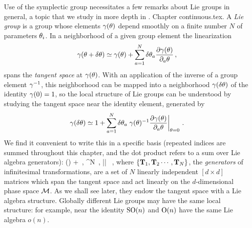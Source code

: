 %
Use of the symplectic group necessitates a few remarks about
Lie groups in general, a topic that we study in more depth in
	   \ifdasbuch
{}.
		\else
Chapter continuous.tex.
		\fi
A \emph{Lie group} is a group whose elements $\gamma(\theta)$ depend smoothly
on a finite number $N$ of parameters $\theta_i$. In a neighborhood of a
given group element the linearization
\[
\gamma(\theta+\delta\theta) \simeq \gamma(\theta)
+  \sum_{a=1}^N  \delta\theta_a
	\frac{\partial \gamma(\theta)}{\partial_a \theta}
\,,
\]
spans the \emph{tangent space} at $\gamma(\theta)$. With an application
of the inverse of a group element $\gamma^{-1}$, this neighborhood can be
mapped into a neighborhood $\gamma(\delta\theta)$ of the identity
$\gamma(0)=1$, so the local structure of Lie groups can be understood by
studying the tangent space near the identity element, generated by
\[
\gamma(\delta\theta) \simeq 1
+ \sum_{a=1}^N \delta\theta_a \left.
	\gamma(\theta)^{-1}
	\frac{\partial \gamma(\theta)}{\partial_a \theta}
		\right|_{\theta=0}
\,.
\]
We find it convenient to write this in a specific basis
(repeated indices are summed throughout this
chapter, and the dot product refers to a sum over
Lie algebra generators):
\beq
\LieEl(\delta\gSpace)  + \delta \gSpace \cdot \Lg
    \,,\quad
\delta\gSpace \in \reals^N
    \,,\quad
|\delta \gSpace| 
    \, ,
where $\{\mathbf{T}_1,\mathbf{T}_2\cdots,\mathbf{T}_N\}$, the {\em generators} of
infinitesimal transformations, are a set of $N$ linearly independent
$[d\!\times\!d]$ matrices which span the tangent space and act linearly
on the $d$-dim\-ens\-ion\-al phase space ${\cal M}$. As we shall see later,
they endow the tangent space with a Lie algebra structure. Globally
different Lie groups may have the same local structure: for example, near
the identity $\textrm{SO}(n)$ and $\textrm{O}(n)$ have the same Lie algebra $o(n)$.

